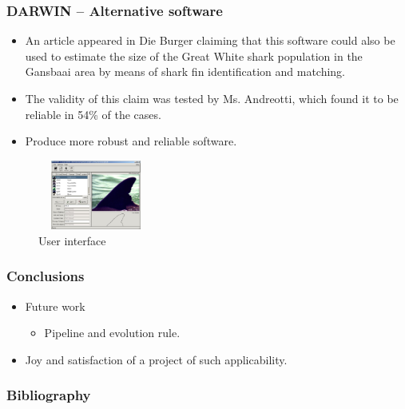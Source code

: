 \documentclass{beamer}
\newcommand{\myitem}{\item[$-$]}
\begin{document}
\begin{frame}
\frametitle{DARWIN -- Alternative software}
\begin{itemize}
 \item An article appeared in Die Burger claiming that this
 software could also be used to estimate the size of the Great White shark
 population in the Gansbaai area by means of shark fin identification and
 matching.\cite{Darwin}
 \item The validity of this claim was tested by Ms. Andreotti, which found it to
 be reliable in 54\% of the cases.
 \item Produce more robust and reliable software.
\end{itemize}
\begin{figure}
 \centering
 \includegraphics[width=1.5in, height=0.9in]{Darwin.jpg}
 \caption{User interface}
\end{figure}
\end{frame}


\begin{frame}
\frametitle{Conclusions}
\begin{itemize}
\item Future work
\begin{itemize}
 \myitem Pipeline and evolution rule.
\end{itemize}
\item Joy and satisfaction of a project of such applicability.
\end{itemize}
\end{frame}


\begin{frame}
\frametitle{Bibliography}


\end{frame}
\end{document}

